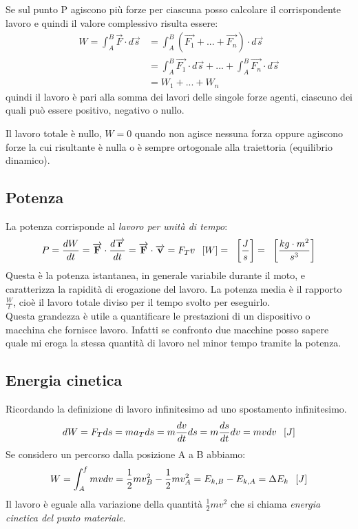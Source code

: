 \documentclass[class=book, crop=false, oneside, 12pt]{standalone}
\begin{document}
Se sul punto P agiscono più forze per ciascuna posso calcolare il corrispondente lavoro e quindi il valore complessivo risulta essere:
\begin{equation}
    \begin{split}
        W = \int_A^B \overrightarrow{F} \cdot d \overrightarrow{s} & = \int_A^B (\overrightarrow{F_1} + ... + \overrightarrow{F_n}) \cdot d \overrightarrow{s} \\
        & = \int_A^B \overrightarrow{F_1} \cdot d \overrightarrow{s} + ... + \int_A^B \overrightarrow{F_n} \cdot d \overrightarrow{s} \\
        & = W_1 + ... + W_n
    \end{split}
\end{equation}
quindi il lavoro è pari alla somma dei lavori delle singole forze agenti, ciascuno dei quali può essere positivo, negativo o nullo.

Il lavoro totale è nullo, \(W = 0\) quando non agisce nessuna forza oppure agiscono forze la cui risultante è nulla o è sempre ortogonale alla traiettoria (equilibrio dinamico).

\subsection{Potenza}

La potenza corrisponde al \emph{lavoro per unità di tempo}:
\begin{equation}
    P = \frac{dW}{dt} = \overrightarrow{F} \cdot \frac{d \overrightarrow{r}}{dt} = \overrightarrow{F} \cdot \overrightarrow{v} = F_T v \udm{W} = \udm{\frac{J}{s}} = \udm{\frac{kg \cdot m^2}{s^3}}
\end{equation}
Questa è la potenza istantanea, in generale variabile durante il moto, e caratterizza la rapidità di erogazione del lavoro.
La potenza media è il rapporto \(\frac{W}{t}\), cioè il lavoro totale diviso per il tempo svolto per eseguirlo.\\
Questa grandezza è utile a quantificare le prestazioni di un dispositivo o macchina che fornisce lavoro.
Infatti se confronto due macchine posso sapere quale mi eroga la stessa quantità di lavoro nel minor tempo tramite la potenza.

\subsection{Energia cinetica}

Ricordando la definizione di lavoro infinitesimo ad uno spostamento infinitesimo.
\begin{equation*}
    d W=F_T d s=m a_T d s=m \frac{d v}{d t} d s=m \frac{d s}{d t} d v=m v d v \hspace{0.2cm} \left[J\right]
\end{equation*}
Se considero un percorso dalla posizione A a B abbiamo:
\begin{equation}
    W=\int_{A}^{f} m v d v=\frac{1}{2} m v_{B}^{2}-\frac{1}{2} m v_{A}^{2}=E_{k, B}-E_{k, A}=\Delta E_{k} \hspace{0.2cm} \left[J\right]
\end{equation}
Il lavoro è eguale alla variazione della quantità \(\frac{1}{2} m v^2\) che si chiama \emph{energia cinetica del punto materiale}.
\end{document}
